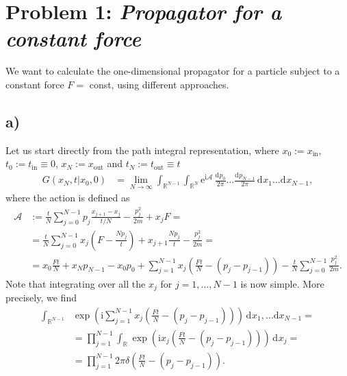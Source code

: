 \documentclass[english, parskip=full]{scrartcl}
\title{\titel}
\author{\autor}
\date{\today}
\newcommand{\intr}{}
\newcommand{\kla}{}
\newcommand{\tecxt}{}
\renewcommand{\i}{\text{i}}
\newcommand{\e}{\text{e}}
\begin{document}
\maketitle  %

\section*{Problem 1: \normalfont\textit{\large{Propagator for a constant force}}}
We want to calculate the one-dimensional propagator for a particle subject to a constant force $F =$ const, using different approaches.
\subsection*{a)}
Let us start directly from the path integral representation, where $x_0:=x_\tecxt\text{in}$, $t_0:=t_\tecxt\text{in}\equiv 0$, $x_N:=x_\tecxt\text{out}$ and $t_N:=t_\tecxt\text{out}\equiv t$
\begin{align}
G(x_N,t|x_0,0) &= \lim_{N\rightarrow\infty} \intr\int_{\mathbb{R}^{N-1}} \intr\int_{\mathbb{R}^{N}} \e^{\i\mathcal{A}} \, \frac{\mathrm{d}^{ }p_0}{2\pi}\dots\frac{\mathrm{d}^{ }p_{N-1}}{2\pi} \, \mathrm{d}^{ }x_1\dots\mathrm{d}^{ } x_{N-1},
\end{align}
where the action is defined as
\begin{align}
\mathcal{A} &:= \frac{t}{N}\sum_{j=0}^{N-1} p_j\frac{x_{j+1} - x_j}{t/N} - \frac{p_j^2}{2m} + x_jF = \\
&= \frac{t}{N}\sum_{j=0}^{N-1} x_j\kla\left( F - \frac{Np_j}{t} \right) + x_{j+1}\frac{Np_j}{t} - \frac{p_j^2}{2m} = \\
&= x_0\frac{Ft}{N} + x_Np_{N-1} - x_0p_0 + \sum_{j=1}^{N-1} x_j\kla\left( \frac{Ft}{N} - (p_j - p_{j-1}) \right) - \frac{t}{N}\sum_{j=0}^{N-1} \frac{p_j^2}{2m}.
\end{align}
Note that integrating over all the $x_j$ for $j=1,\dots,N-1$ is now simple.
More precisely, we find
\begin{align}
\intr\int_{\mathbb{R}^{N-1}} &\exp\kla\left( \i\sum_{j=1}^{N-1} x_j\kla\left( \frac{Ft}{N} - (p_j - p_{j-1}) \right) \right) \, \mathrm{d}^{ }x_1,\dots\mathrm{d}x_{N-1} = \\
&= \prod_{j=1}^{N-1} \intr\int_{\mathbb{R}^{ }} \exp\kla\left( \i x_j\kla\left( \frac{Ft}{N} - (p_j - p_{j-1}) \right) \right) \, \mathrm{d}^{ }x_j = \\
&= \prod_{j=1}^{N-1} 2\pi\delta \kla\left( \frac{Ft}{N} - (p_j - p_{j-1}) \right).
\end{align}
\end{document}

